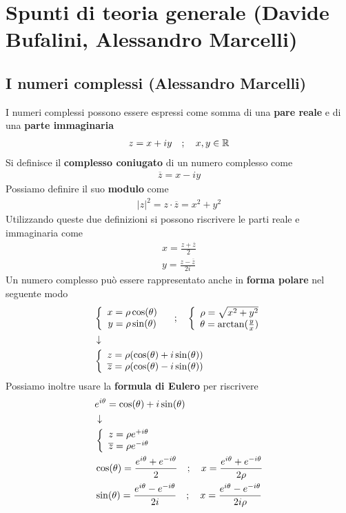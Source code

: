\section{Spunti di teoria generale (Davide Bufalini, Alessandro Marcelli)}

\subsection{I numeri complessi (Alessandro Marcelli)}

I numeri complessi possono essere espressi come somma di una \textbf{pare reale} e di una \textbf{parte immaginaria}
\begin{align}
	z = x + iy \quad ; \quad x,y \in \mathbb{R}
\end{align}
Si definisce il \textbf{complesso coniugato} di un numero complesso come
\begin{align}
	\overline{z} = x-iy
\end{align}
Possiamo definire il suo \textbf{modulo} come
\begin{align}
	|z|^2 = z \cdot \overline{z} = x^2 + y^2
\end{align}
Utilizzando queste due definizioni si possono riscrivere le parti reale e immaginaria come
\begin{align}
	x = \frac{z+ \overline{z}}{2}\\
	y = \frac{z- \overline{z}}{2i}
\end{align}
Un numero complesso può essere rappresentato anche in \textbf{forma polare} nel seguente modo
\begin{align}
	&\left\{ \begin{array}{cc} x = \rho \cos (\theta)\\ y = \rho \sin (\theta) \end{array} \right. \quad ; \quad \left\{ \begin{array}{cc} \rho = \sqrt{x^2 + y^2}\\ \theta = \arctan (\frac{y}{x}) \end{array} \right.\\ &\downarrow \nonumber \\
	&\left\{ \begin{array}{cc} z =  \rho (\cos (\theta) + i\sin(\theta))\\ \overline{z} = \rho (\cos (\theta) - i\sin(\theta)) \end{array} \right.
\end{align}
Possiamo inoltre usare la \textbf{formula di Eulero} per riscrivere
\begin{align}
	&e^{i\theta} = \cos(\theta)+ i \sin (\theta)\\ &\downarrow \nonumber \\
	&\left\{ \begin{array}{cc} z = \rho e^{+i\theta}\\ \overline{z} = \rho e^{-i\theta} \end{array} \right.\\
	&\cos (\theta) = \frac{e^{i\theta} + e^{-i\theta}}{2} \quad ; \quad x= \frac{e^{i\theta} + e^{-i\theta}}{2\rho}\\
	&\sin (\theta) = \frac{e^{i\theta} - e^{-i\theta}}{2i} \quad ; \quad x= \frac{e^{i\theta} - e^{-i\theta}}{2i\rho}
\end{align}

\newpage

